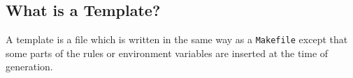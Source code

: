 \subsection{What is a Template?}

A template is a file which is written in the same way as a
\texttt{Makefile} except that some parts of the rules or environment
variables are inserted at the time of generation.














